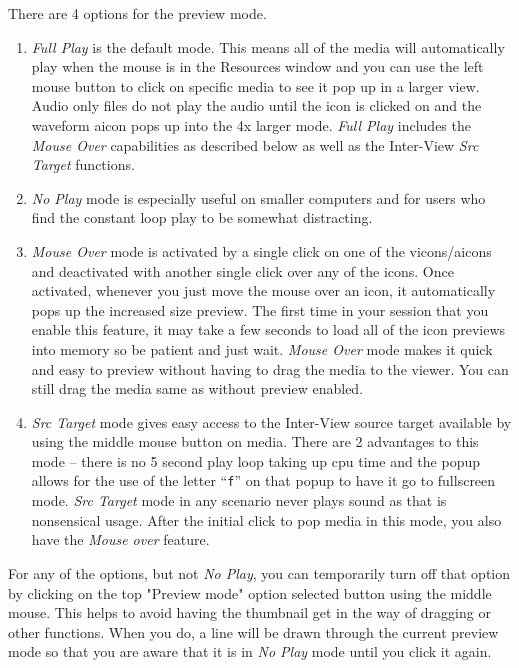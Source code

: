 There are 4 options for the preview mode.

\begin{enumerate}
    \item  \emph{Full Play}  is the default mode.  
        This means all of the media will automatically play when the mouse is in the Resources window and you can use the left mouse button to click on specific media to see it pop up in a larger view.  
        Audio only files do not play the audio until the icon is clicked on and the waveform aicon pops up into the 4x larger mode. 
        \emph{Full Play} includes the \emph{Mouse Over} capabilities as described below as well as the Inter-View \emph{Src Target} functions.

	\item  \emph{No Play}  mode is especially useful on smaller computers and for users who find the constant loop play to be somewhat distracting.

	\item  \emph{Mouse Over}  mode is activated by a single click on one of the vicons/aicons and deactivated with another single click over any of the icons.  
    Once activated, whenever you just move the mouse over an icon, it automatically pops up the increased size preview.  
    The first time in your session that you enable this feature, it may take a few seconds to load all of the icon previews into memory so be patient and just wait.  
    \emph{Mouse Over} mode makes it quick and easy to preview without having to drag the media to the viewer.  
    You can still drag the media same as without preview enabled.  

	\item  \emph{Src Target}  mode gives easy access to the Inter-View source target available by using the middle mouse button on media.  
    There are 2 advantages to this mode -- there is no 5 second play loop taking up cpu time and the popup allows for the use of the letter “\texttt{f}” on that popup to have it go to fullscreen mode.  
    \emph{Src Target} mode in any scenario never plays sound as that is nonsensical usage.  
    After the initial click to pop media in this mode, you also have the \emph{Mouse over} feature.
\end{enumerate}

For any of the options, but not \emph{No Play}, you can temporarily turn off that option by clicking on the top "Preview mode" option selected button using the middle mouse.  
This helps to avoid having the thumbnail get in the way of dragging or other functions.  
When you do, a line will be drawn through the current preview mode so that you are aware that it is in \emph{No Play} mode until you click it again.


